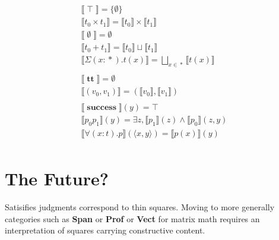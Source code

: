 \documentclass[twocolumn]{scrartcl}
\newcommand{\bnfdef}{\mathrel{::=}}
\DeclareMathOperator{\unit}{\top}
\DeclareMathOperator{\mt}{\emptyset}
\DeclareMathOperator{\coin}{\textbf{tt}}
\DeclareMathOperator{\fst}{\pi_1}
\DeclareMathOperator{\snd}{\pi_2}
\DeclareMathOperator{\success}{\textbf{success}}
\newcommand{\pass}{;}
\DeclareMathOperator{\prop}{*}
\begin{document}
\begin{multline*}
  \\
  \llbracket \unit \rrbracket = \{ \emptyset \} \\
  \llbracket t_0 \times t_1 \rrbracket = \llbracket t_0 \rrbracket \times \llbracket t_1 \rrbracket \\
  \llbracket \mt \rrbracket = \emptyset \\
  \llbracket t_0 + t_1 \rrbracket = \llbracket t_0 \rrbracket \sqcup \llbracket t_1 \rrbracket \\
  \llbracket \Sigma (x \colon \prop). t(x) \rrbracket = \bigsqcup_{ x \in \prop} \llbracket t(x) \rrbracket \\
  \\
  \llbracket \coin \rrbracket = \emptyset \\
  \llbracket ( v_0 , v_1 ) \rrbracket = ( \llbracket v_0 \rrbracket , \llbracket v_1 \rrbracket ) \\
  \\
  \llbracket \success \rrbracket(y) = \top \\
  \llbracket p_0 p_1 \rrbracket(y) = \exists z,  \llbracket p_1 \rrbracket (z) \wedge \llbracket p_0 \rrbracket (z, y)\\
  \llbracket \forall (x \colon t). p \rrbracket(\langle x, y \rangle) = \llbracket p(x) \rrbracket (y)  \\
\end{multline*}


\section*{The Future?}

Satisifies judgments correspond to thin squares. Moving to more
generally categories such as \textbf{Span} or \textbf{Prof} or
\textbf{Vect} for matrix math requires an interpretation of squares
carrying constructive content.
\end{document}
